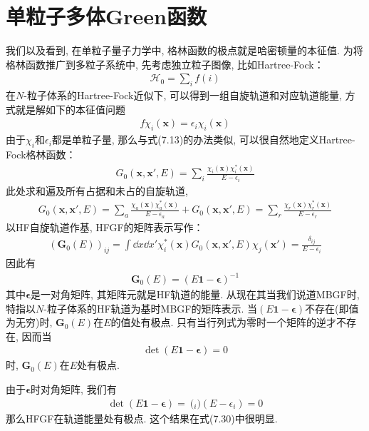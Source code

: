 \section{单粒子多体Green函数}
我们以及看到, 在单粒子量子力学中, 格林函数的极点就是哈密顿量的本征值. 为将格林函数推广到多粒子系统中, 先考虑独立粒子图像, 比如Hartree-Fock：
\begin{align*}
\mathscr{H}_0 = \sum_i f(i)
\end{align*} 
在$N$-粒子体系的Hartree-Fock近似下, 可以得到一组自旋轨道和对应轨道能量, 方式就是解如下的本征值问题
\begin{align}
f\chi_i(\mathbf{x}) = \epsilon_i\chi_i(\mathbf{x})
\end{align}
由于$\chi_i$和$\epsilon_i$都是单粒子量, 那么与式(7.13)的办法类似, 可以很自然地定义Hartree-Fock格林函数：
\begin{align}
G_0(\mathbf{x,x'},E) = \sum_i \frac{\chi_i(\mathbf{x})\chi_i^*(\mathbf{x})}{E-\epsilon_i}
\end{align}
此处求和遍及所有占据和未占的自旋轨道,
\begin{align}
G_0(\mathbf{x,x'},E) = \sum_a \frac{\chi_a(\mathbf{x})\chi_a^*(\mathbf{x})}{E-\epsilon_a} + G_0(\mathbf{x,x'},E) = \sum_r \frac{\chi_r(\mathbf{x})\chi_r^*(\mathbf{x})}{E-\epsilon_r}
\end{align}
以HF自旋轨道作基, HFGF的矩阵表示写作：
\begin{align}
(\mathbf{G}_0(E))_{ij} = \int\dd{x}\dd{x'}\chi_i^*(\mathbf{x})G_0(\mathbf{x,x'},E)\chi_j(\mathbf{x'}) = \frac{\delta_{ij}}{E - \epsilon_i}
\end{align}
因此有
\begin{align}
\mathbf{G}_0(E) = (E\mathbf{1} - \bm{\epsilon})^{-1}
\end{align}
其中$\bm{\epsilon}$是一对角矩阵, 其矩阵元就是HF轨道的能量. 从现在其当我们说道MBGF时, 特指以$N$-粒子体系的HF轨道为基时MBGF的矩阵表示.  当$(E\bm{1-\epsilon})$不存在(即值为无穷)时, $\mathbf{G}_0(E)$在$E$的值处有极点. 只有当行列式为零时一个矩阵的逆才不存在, 因而当
\begin{align*}
\det(E\bm{1-\epsilon})=0
\end{align*}
时, $\mathbf{G}_0(E)$在$E$处有极点.

由于$\bm{\epsilon}$时对角矩阵, 我们有
\begin{align}
\det(E\bm{1-\epsilon}) = \pod_i (E-\epsilon_i) = 0
\end{align}
那么HFGF在\hft 轨道能量处有极点. 这个结果在式(7.30)中很明显.

